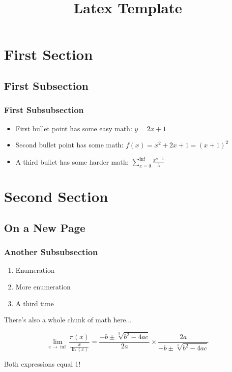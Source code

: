 \documentclass[10pt]{article}
\title{Latex Template}
\date{}
\begin{document}
\maketitle
\tableofcontents
\section{First Section}
\subsection{First Subsection}
\subsubsection{First Subsubsection}
\begin{itemize}
    \item First bullet point has some easy math: $y = 2x + 1$
    \item Second bullet point has some math: $f(x) = x^2+2x+1 = (x+1)^2$
    \item A third bullet has some harder math: $\sum_{x=0}^{\inf} \frac{x^{n+1}}{5}$
\end{itemize}

\newpage

\section{Second Section}
\subsection{On a New Page}
\subsubsection{Another Subsubsection}
\begin{enumerate}
    \item Enumeration
    \item More enumeration
    \item A third time
\end{enumerate}

There's also a whole chunk of math here...

$$\lim_{x \rightarrow \inf} \frac{\pi (x)} {\frac{x}{\ln (x)}} = \frac{-b \pm \sqrt[3]{b^2-4ac}}{2a} \times \frac{2a}{-b \pm \sqrt[3]{b^2-4ac}}$$

Both expressions equal 1!
\end{document}
